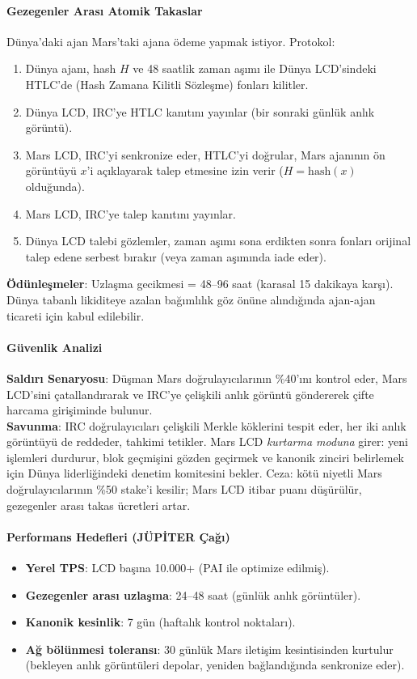 \documentclass[11pt]{article}
\begin{document}
\paragraph{Gezegenler Arası Atomik Takaslar}
Dünya'daki ajan Mars'taki ajana ödeme yapmak istiyor. Protokol:
\begin{enumerate}[noitemsep]
  \item Dünya ajanı, hash $H$ ve 48 saatlik zaman aşımı ile Dünya LCD'sindeki HTLC'de (Hash Zamana Kilitli Sözleşme) fonları kilitler.
  \item Dünya LCD, IRC'ye HTLC kanıtını yayınlar (bir sonraki günlük anlık görüntü).
  \item Mars LCD, IRC'yi senkronize eder, HTLC'yi doğrular, Mars ajanının ön görüntüyü $x$'i açıklayarak talep etmesine izin verir ($H = \text{hash}(x)$ olduğunda).
  \item Mars LCD, IRC'ye talep kanıtını yayınlar.
  \item Dünya LCD talebi gözlemler, zaman aşımı sona erdikten sonra fonları orijinal talep edene serbest bırakır (veya zaman aşımında iade eder).
\end{enumerate}
\textbf{Ödünleşmeler}: Uzlaşma gecikmesi = 48--96 saat (karasal 15 dakikaya karşı). Dünya tabanlı likiditeye azalan bağımlılık göz önüne alındığında ajan-ajan ticareti için kabul edilebilir.

\paragraph{Güvenlik Analizi}
\textbf{Saldırı Senaryosu}: Düşman Mars doğrulayıcılarının \%40'ını kontrol eder, Mars LCD'sini çatallandırarak ve IRC'ye çelişkili anlık görüntü göndererek çifte harcama girişiminde bulunur.\\
\textbf{Savunma}: IRC doğrulayıcıları çelişkili Merkle köklerini tespit eder, her iki anlık görüntüyü de reddeder, tahkimi tetikler. Mars LCD \emph{kurtarma moduna} girer: yeni işlemleri durdurur, blok geçmişini gözden geçirmek ve kanonik zinciri belirlemek için Dünya liderliğindeki denetim komitesini bekler. Ceza: kötü niyetli Mars doğrulayıcılarının \%50 stake'i kesilir; Mars LCD itibar puanı düşürülür, gezegenler arası takas ücretleri artar.

\paragraph{Performans Hedefleri (JÜPİTER Çağı)}
\begin{itemize}[noitemsep]
  \item \textbf{Yerel TPS}: LCD başına 10.000+ (PAI ile optimize edilmiş).
  \item \textbf{Gezegenler arası uzlaşma}: 24--48 saat (günlük anlık görüntüler).
  \item \textbf{Kanonik kesinlik}: 7 gün (haftalık kontrol noktaları).
  \item \textbf{Ağ bölünmesi toleransı}: 30 günlük Mars iletişim kesintisinden kurtulur (bekleyen anlık görüntüleri depolar, yeniden bağlandığında senkronize eder).
\end{itemize}
\end{document}
